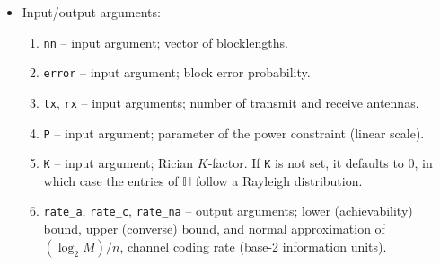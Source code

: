 \documentclass[a4paper,11p]{memoir}
\begin{document}
\begin{itemize}
\item Input/output arguments:
\begin{enumerate}
\item \verb|nn| -- input argument; vector of blocklengths.
\item \verb|error| -- input argument; block error probability.
\item \verb|tx|, \verb|rx| -- input arguments; number of transmit and receive antennas.
\item \verb|P| -- input argument; parameter of the power constraint (linear scale).
\item \verb|K| -- input argument; Rician $K$-factor. If \verb|K| is not set, it defaults to $0$, in which case the entries of $\mathbb{H}$ follow a Rayleigh distribution.
\item \verb|rate_a|, \verb|rate_c|, \verb|rate_na| -- output arguments; lower (achievability) bound, upper (converse) bound, and normal approximation of  $(\log_2 M)/n$, channel coding rate (base-2 information units).
\end{enumerate}

\end{itemize}
\end{document}
